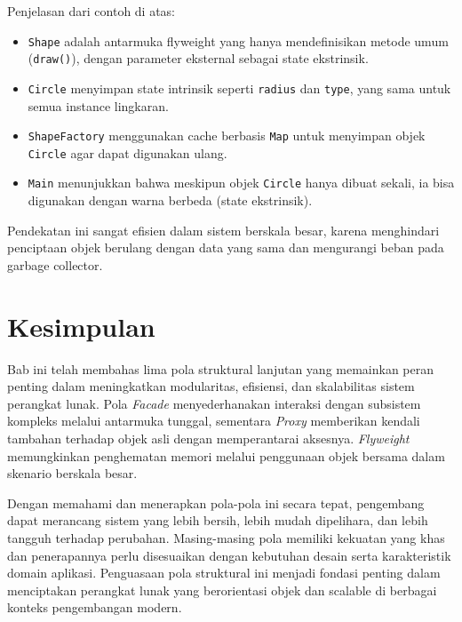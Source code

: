 Penjelasan dari contoh di atas:
\begin{itemize}
	\item \texttt{Shape} adalah antarmuka flyweight yang hanya mendefinisikan metode umum (\texttt{draw()}), dengan parameter eksternal sebagai state ekstrinsik.
	\item \texttt{Circle} menyimpan state intrinsik seperti \texttt{radius} dan \texttt{type}, yang sama untuk semua instance lingkaran.
	\item \texttt{ShapeFactory} menggunakan cache berbasis \texttt{Map} untuk menyimpan objek \texttt{Circle} agar dapat digunakan ulang.
	\item \texttt{Main} menunjukkan bahwa meskipun objek \texttt{Circle} hanya dibuat sekali, ia bisa digunakan dengan warna berbeda (state ekstrinsik).
\end{itemize}

Pendekatan ini sangat efisien dalam sistem berskala besar, karena menghindari penciptaan objek berulang dengan data yang sama dan mengurangi beban pada garbage collector.




\section{Kesimpulan}

Bab ini telah membahas lima pola struktural lanjutan yang memainkan peran penting dalam meningkatkan modularitas, efisiensi, dan skalabilitas sistem perangkat lunak. Pola \textit{Facade} menyederhanakan interaksi dengan subsistem kompleks melalui antarmuka tunggal, sementara \textit{Proxy} memberikan kendali tambahan terhadap objek asli dengan memperantarai aksesnya. \textit{Flyweight} memungkinkan penghematan memori melalui penggunaan objek bersama dalam skenario berskala besar.

Dengan memahami dan menerapkan pola-pola ini secara tepat, pengembang dapat merancang sistem yang lebih bersih, lebih mudah dipelihara, dan lebih tangguh terhadap perubahan. Masing-masing pola memiliki kekuatan yang khas dan penerapannya perlu disesuaikan dengan kebutuhan desain serta karakteristik domain aplikasi. Penguasaan pola struktural ini menjadi fondasi penting dalam menciptakan perangkat lunak yang berorientasi objek dan scalable di berbagai konteks pengembangan modern.

